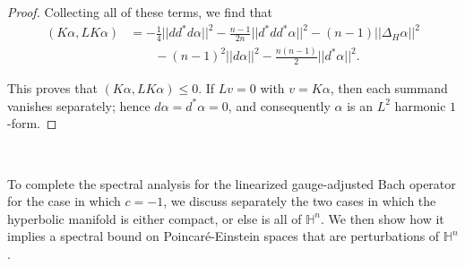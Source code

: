 \documentclass[10pt,reqno]{amsart}
\begin{document}
\begin{proof}
Collecting all of these terms, we find that
\begin{align*}
(K\alpha, LK\alpha) & = -\frac14 ||dd^*d\alpha||^2 - \frac{n-1}{2n} ||d^* d d^*\alpha||^2 - (n-1) ||\Delta_H \alpha||^2 \\ 
& \qquad - (n-1)^2 ||d\alpha||^2 - \frac{n(n-1)}{2} ||d^*\alpha||^2. 
\end{align*}

This proves that $(K \alpha, L K \alpha) \leq 0$.   If $L v = 0$ with $v = K \alpha$, then each summand vanishes separately; hence 
$d\alpha = d^* \alpha = 0$, and consequently $\alpha$ is an $L^2$ harmonic $1$-form.  
\end{proof}

\

To complete the spectral analysis for the linearized gauge-adjusted Bach operator for the case in which $c=-1$, we discuss separately the two cases in which the hyperbolic 
manifold is either compact, or else is all of $\mathbb H^n$. We then show how it implies a spectral bound on Poincar\'e-Einstein spaces that are perturbations of $\mathbb H^n$.

\medskip
\end{document}
